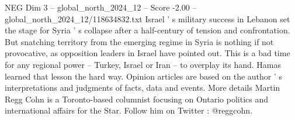 \begin{textsample}{NEG Dim 3 – global\_north\_2024\_12 – Score -2.00 – global\_north\_2024\_12/118634832.txt}
Israel ' s military success in Lebanon set the stage for Syria ' s collapse after a half-century of tension and confrontation.
But snatching territory from the emerging regime in Syria is nothing if not provocative, as opposition leaders in Israel have pointed out.
This is a bad time for any regional power -- Turkey, Israel or Iran -- to overplay its hand.
Hamas learned that lesson the hard way.
Opinion articles are based on the author ' s interpretations and judgments of facts, data and events.
More details Martin Regg Cohn is a Toronto-based columnist focusing on Ontario politics and international affairs for the Star.
Follow him on Twitter : @reggcohn.

\end{textsample}

